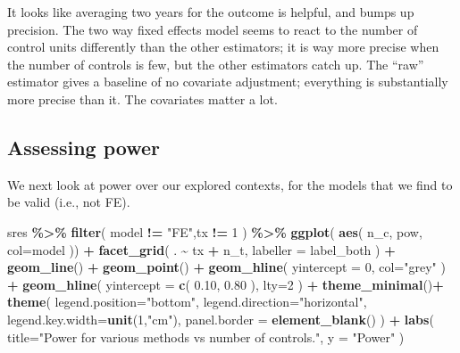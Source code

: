 \documentclass[
]{book}
\newenvironment{Shaded}{\begin{snugshade}}{\end{snugshade}}
\newcommand{\AttributeTok}[1]{\textcolor[rgb]{0.13,0.29,0.53}{#1}}
\newcommand{\DecValTok}[1]{\textcolor[rgb]{0.00,0.00,0.81}{#1}}
\newcommand{\FloatTok}[1]{\textcolor[rgb]{0.00,0.00,0.81}{#1}}
\newcommand{\FunctionTok}[1]{\textcolor[rgb]{0.13,0.29,0.53}{\textbf{#1}}}
\newcommand{\NormalTok}[1]{#1}
\newcommand{\SpecialCharTok}[1]{\textcolor[rgb]{0.81,0.36,0.00}{\textbf{#1}}}
\newcommand{\StringTok}[1]{\textcolor[rgb]{0.31,0.60,0.02}{#1}}
\begin{document}
It looks like averaging two years for the outcome is helpful, and bumps up precision.
The two way fixed effects model seems to react to the number of control units differently than the other estimators; it is way more precise when the number of controls is few, but the other estimators catch up.
The ``raw'' estimator gives a baseline of no covariate adjustment; everything is substantially more precise than it.
The covariates matter a lot.

\subsection{Assessing power}\label{assessing-power-1}

We next look at power over our explored contexts, for the models that we find to be valid (i.e., not FE).

\begin{Shaded}
\begin{Highlighting}[]
\NormalTok{sres }\SpecialCharTok{\%\textgreater{}\%} 
  \FunctionTok{filter}\NormalTok{( model }\SpecialCharTok{!=} \StringTok{"FE"}\NormalTok{,tx }\SpecialCharTok{!=} \DecValTok{1}\NormalTok{ ) }\SpecialCharTok{\%\textgreater{}\%}
  \FunctionTok{ggplot}\NormalTok{( }\FunctionTok{aes}\NormalTok{( n\_c, pow, }\AttributeTok{col=}\NormalTok{model )) }\SpecialCharTok{+}
    \FunctionTok{facet\_grid}\NormalTok{(  . }\SpecialCharTok{\textasciitilde{}}\NormalTok{ tx }\SpecialCharTok{+}\NormalTok{ n\_t, }\AttributeTok{labeller =}\NormalTok{ label\_both ) }\SpecialCharTok{+}
    \FunctionTok{geom\_line}\NormalTok{() }\SpecialCharTok{+} \FunctionTok{geom\_point}\NormalTok{() }\SpecialCharTok{+}
    \FunctionTok{geom\_hline}\NormalTok{( }\AttributeTok{yintercept =} \DecValTok{0}\NormalTok{, }\AttributeTok{col=}\StringTok{"grey"}\NormalTok{ ) }\SpecialCharTok{+}
    \FunctionTok{geom\_hline}\NormalTok{( }\AttributeTok{yintercept =} \FunctionTok{c}\NormalTok{( }\FloatTok{0.10}\NormalTok{, }\FloatTok{0.80}\NormalTok{ ), }\AttributeTok{lty=}\DecValTok{2}\NormalTok{ ) }\SpecialCharTok{+}
  \FunctionTok{theme\_minimal}\NormalTok{()}\SpecialCharTok{+} \FunctionTok{theme}\NormalTok{( }\AttributeTok{legend.position=}\StringTok{"bottom"}\NormalTok{,}
                          \AttributeTok{legend.direction=}\StringTok{"horizontal"}\NormalTok{,}
                          \AttributeTok{legend.key.width=}\FunctionTok{unit}\NormalTok{(}\DecValTok{1}\NormalTok{,}\StringTok{"cm"}\NormalTok{),}
                          \AttributeTok{panel.border =} \FunctionTok{element\_blank}\NormalTok{() ) }\SpecialCharTok{+}
  \FunctionTok{labs}\NormalTok{( }\AttributeTok{title=}\StringTok{"Power for various methods vs number of controls."}\NormalTok{,}
      \AttributeTok{y =} \StringTok{"Power"}\NormalTok{ )}
\end{Highlighting}
\end{Shaded}
\end{document}
